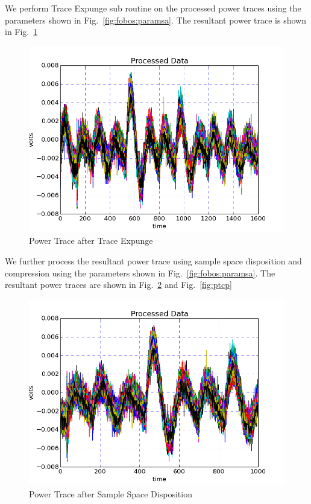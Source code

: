\documentclass{llncs}
\numberwithin{algorithm}{chapter}
\begin{document}
We perform Trace Expunge sub routine on the processed power traces
using the parameters shown in Fig.~\ref{fig:fobos:paramsa}. The resultant power trace is
shown in Fig.~\ref{fig:pttx}

\begin{figure}[h]
\begin{center}
\includegraphics[scale=0.8]{figures/scaTrace2}
\caption{\label{fig:pttx}Power Trace after Trace Expunge}
\end{center} 
\vspace{-3ex}
\end{figure}

We further process the resultant power trace using sample space disposition and compression
using the parameters shown in Fig.~\ref{fig:fobos:paramsa}.
 The resultant
power traces are shown in Fig.~\ref{fig:ptsp} and Fig.~\ref{fig:ptcp}

\begin{figure}[h]
\begin{center}
\includegraphics[scale=0.8]{figures/scaTrace3}
\caption{\label{fig:ptsp}Power Trace after Sample Space Disposition}
\end{center} 
\vspace{-3ex}
\end{figure}
\end{document}
